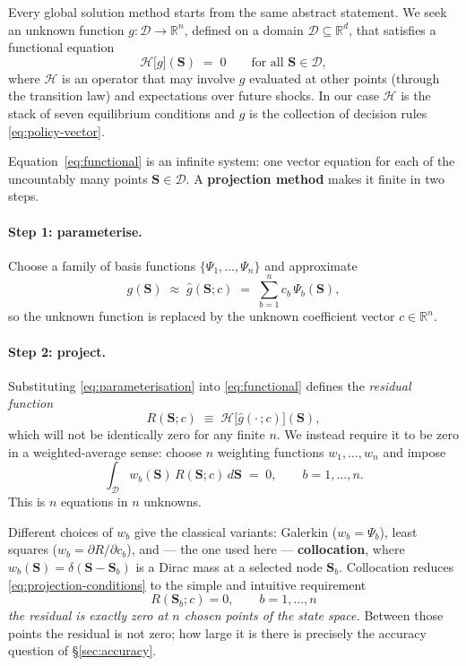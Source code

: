 \documentclass[11pt]{article}
\numberwithin{equation}{section}
\newcommand{\R}{\mathbb{R}}
\newcommand{\bS}{\mathbf{S}}
\theoremstyle{definition}
\theoremstyle{plain}
\theoremstyle{remark}
\begin{document}
Every global solution method starts from the same abstract statement. We seek an
unknown function $g:\mathcal{D}\to\R^{n}$, defined on a domain
$\mathcal{D}\subseteq\R^{d}$, that satisfies a functional equation
\begin{equation}
\mathcal{H}\bigl[g\bigr](\bS)\;=\;0
\qquad\text{for all }\bS\in\mathcal{D},
\label{eq:functional}
\end{equation}
where $\mathcal{H}$ is an operator that may involve $g$ evaluated at other points
(through the transition law) and expectations over future shocks. In our case
$\mathcal{H}$ is the stack of seven equilibrium conditions and $g$ is the collection
of decision rules \eqref{eq:policy-vector}.

Equation~\eqref{eq:functional} is an infinite system: one vector equation for each
of the uncountably many points $\bS\in\mathcal{D}$. A \textbf{projection method}
makes it finite in two steps.

\paragraph{Step 1: parameterise.} Choose a family of basis functions
$\{\Psi_1,\dots,\Psi_n\}$ and approximate
\begin{equation}
g(\bS)\;\approx\;\hat g(\bS;c)\;=\;\sum_{b=1}^{n}c_b\,\Psi_b(\bS),
\label{eq:parameterisation}
\end{equation}
so the unknown function is replaced by the unknown coefficient vector
$c\in\R^{n}$.

\paragraph{Step 2: project.} Substituting \eqref{eq:parameterisation} into
\eqref{eq:functional} defines the \emph{residual function}
\begin{equation}
R(\bS;c)\;\equiv\;\mathcal{H}\bigl[\hat g(\cdot\,;c)\bigr](\bS),
\label{eq:residual-def}
\end{equation}
which will not be identically zero for any finite $n$. We instead require it to be
zero in a weighted-average sense: choose $n$ weighting functions $w_1,\dots,w_n$ and
impose
\begin{equation}
\int_{\mathcal{D}}w_b(\bS)\,R(\bS;c)\,d\bS\;=\;0,
\qquad b=1,\dots,n .
\label{eq:projection-conditions}
\end{equation}
This is $n$ equations in $n$ unknowns.

Different choices of $w_b$ give the classical variants: Galerkin ($w_b=\Psi_b$),
least squares ($w_b=\partial R/\partial c_b$), and --- the one used here ---
\textbf{collocation}, where $w_b(\bS)=\delta(\bS-\bS_b)$ is a Dirac mass at a
selected node $\bS_b$. Collocation reduces \eqref{eq:projection-conditions} to the
simple and intuitive requirement
\begin{equation}
\boxed{\;R(\bS_b;c)=0,\qquad b=1,\dots,n\;}
\label{eq:collocation}
\end{equation}
\emph{the residual is exactly zero at $n$ chosen points of the state space.} Between
those points the residual is not zero; how large it is there is precisely the
accuracy question of \S\ref{sec:accuracy}.
\end{document}
